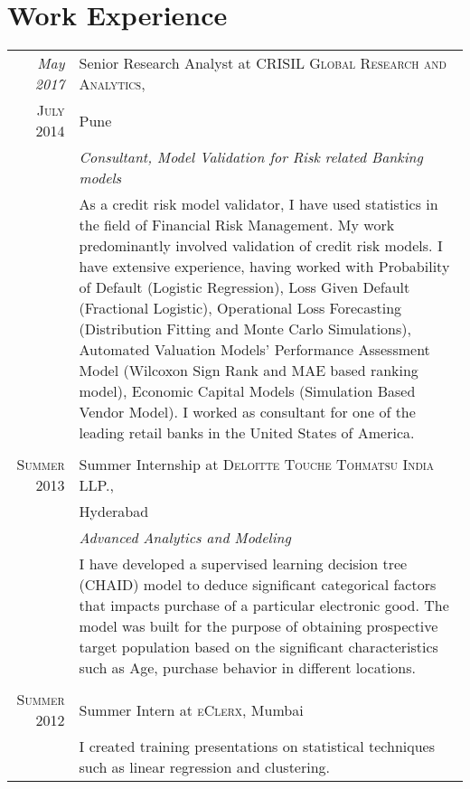 \documentclass[a4paper,10pt]{article}
\begin{document}
\section{Work Experience}
\begin{tabular}{r|p{11cm}}
 \emph{May 2017} & Senior Research Analyst at \textsc{CRISIL Global Research and Analytics}, \\\textsc{July 2014}&Pune \\&\emph{Consultant,  Model Validation for Risk related Banking models}\\&\footnotesize{As a credit risk model validator, I have used statistics in the field of Financial Risk Management. My work predominantly involved validation of credit risk models. I have extensive experience, having worked with Probability of Default (Logistic Regression), Loss Given Default (Fractional Logistic), Operational Loss Forecasting (Distribution Fitting and Monte Carlo Simulations), Automated Valuation Models' Performance Assessment Model (Wilcoxon Sign Rank and MAE based ranking model), Economic Capital Models (Simulation Based Vendor Model). I worked as consultant for one of the leading retail banks in the United States of America.}\\\multicolumn{2}{c}{} \\
 \textsc{Summer 2013} & Summer Internship at \textsc{Deloitte Touche Tohmatsu India LLP.}, \\ & Hyderabad \\&\emph{Advanced Analytics and Modeling}\\&\footnotesize{I have developed a supervised learning decision tree (CHAID) model to deduce significant categorical factors that impacts purchase of a particular electronic good. The model was built for the purpose of obtaining prospective target population based on the significant characteristics such as Age, purchase behavior in different locations.}\\\multicolumn{2}{c}{} \\
\textsc{Summer 2012} & Summer Intern at \textsc{eClerx}, Mumbai \emph{}\\&\footnotesize{I created training presentations on statistical techniques such as linear regression and clustering.}
\end{tabular}

\end{document}
